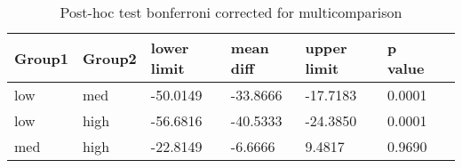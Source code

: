 \begin{table}
\centering
\begin{tabular}[0.2em]{@{}lllllll@{}}\toprule
Group1 & Group2 & lower limit & mean diff & upper limit & p value\\\toprule[0.2em]
low & med & -50.0149 & -33.8666 & -17.7183 & 0.0001 \\\midrule
low & high & -56.6816 & -40.5333 & -24.3850 & 0.0001 \\\midrule
med & high & -22.8149 & -6.6666 & 9.4817 & 0.9690 \\\bottomrule[0.2em]
\end{tabular}
\caption{Post-hoc test bonferroni corrected for multicomparison\label{tabel:null}}
\end{table}
